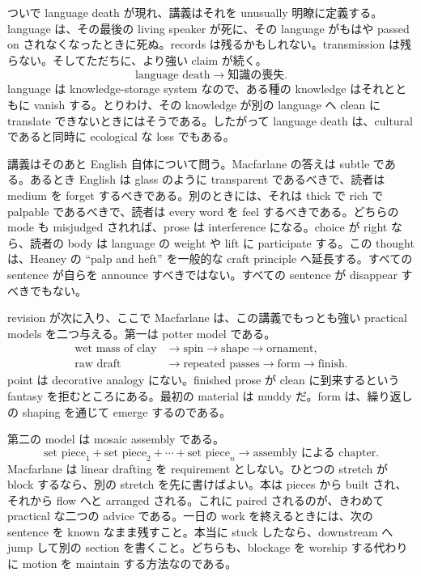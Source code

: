 ついで language death が現れ、講義はそれを unusually 明瞭に定義する。language は、その最後の living speaker が死に、その language がもはや passed on されなくなったときに死ぬ。records は残るかもしれない。transmission は残らない。そしてただちに、より強い claim が続く。
\begin{equation}
\text{language death} \longrightarrow \text{知識の喪失}.
\end{equation}
language は knowledge-storage system なので、ある種の knowledge はそれとともに vanish する。とりわけ、その knowledge が別の language へ clean に translate できないときにはそうである。したがって language death は、cultural であると同時に ecological な loss でもある。

講義はそのあと English 自体について問う。Macfarlane の答えは subtle である。あるとき English は glass のように transparent であるべきで、読者は medium を forget するべきである。別のときには、それは thick で rich で palpable であるべきで、読者は every word を feel するべきである。どちらの mode も misjudged されれば、prose は interference になる。choice が right なら、読者の body は language の weight や lift に participate する。この thought は、Heaney の ``palp and heft'' を一般的な craft principle へ延長する。すべての sentence が自らを announce すべきではない。すべての sentence が disappear すべきでもない。

revision が次に入り、ここで Macfarlane は、この講義でもっとも強い practical models を二つ与える。第一は potter model である。
\begin{align}
\text{wet mass of clay} &\longrightarrow \text{spin} \longrightarrow \text{shape} \longrightarrow \text{ornament},\\
\text{raw draft} &\longrightarrow \text{repeated passes} \longrightarrow \text{form} \longrightarrow \text{finish}.
\end{align}
point は decorative analogy にない。finished prose が clean に到来するという fantasy を拒むところにある。最初の material は muddy だ。form は、繰り返しの shaping を通じて emerge するのである。

第二の model は mosaic assembly である。
\begin{equation}
\text{set piece}_1 + \text{set piece}_2 + \cdots + \text{set piece}_n
\longrightarrow \text{assembly による chapter}.
\end{equation}
Macfarlane は linear drafting を requirement としない。ひとつの stretch が block するなら、別の stretch を先に書けばよい。本は pieces から built され、それから flow へと arranged される。これに paired されるのが、きわめて practical な二つの advice である。一日の work を終えるときには、次の sentence を known なまま残すこと。本当に stuck したなら、downstream へ jump して別の section を書くこと。どちらも、blockage を worship する代わりに motion を maintain する方法なのである。

